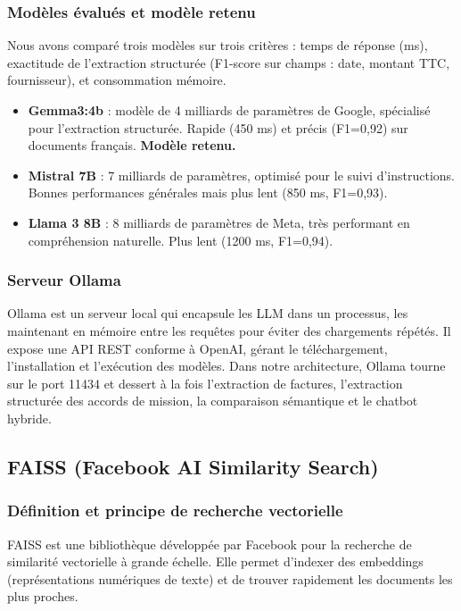 \documentclass[12pt,a4paper]{report}
\begin{document}
\subsubsection{Modèles évalués et modèle retenu}

Nous avons comparé trois modèles sur trois critères : temps de réponse (ms), exactitude de l’extraction structurée (F1-score sur champs : date, montant TTC, fournisseur), et consommation mémoire.

\begin{itemize}
 \item \textbf{Gemma3:4b} : modèle de 4 milliards de paramètres de Google, spécialisé pour l'extraction structurée. Rapide (450 ms) et précis (F1=0,92) sur documents français. \textbf{Modèle retenu.}
 \item \textbf{Mistral 7B} : 7 milliards de paramètres, optimisé pour le suivi d'instructions. Bonnes performances générales mais plus lent (850 ms, F1=0,93).
 \item \textbf{Llama 3 8B} : 8 milliards de paramètres de Meta, très performant en compréhension naturelle. Plus lent (1200 ms, F1=0,94).
\end{itemize}

\subsubsection{Serveur Ollama}

Ollama est un serveur local qui encapsule les LLM dans un processus, les maintenant en mémoire entre les requêtes pour éviter des chargements répétés. Il expose une API REST conforme à OpenAI, gérant le téléchargement, l’installation et l’exécution des modèles. Dans notre architecture, Ollama tourne sur le port 11434 et dessert à la fois l’extraction de factures, l’extraction structurée des accords de mission, la comparaison sémantique et le chatbot hybride.

\subsection{FAISS (Facebook AI Similarity Search)}

\subsubsection{Définition et principe de recherche vectorielle}

FAISS est une bibliothèque développée par Facebook pour la recherche de similarité vectorielle à grande échelle. Elle permet d'indexer des embeddings (représentations numériques de texte) et de trouver rapidement les documents les plus proches.
\end{document}
